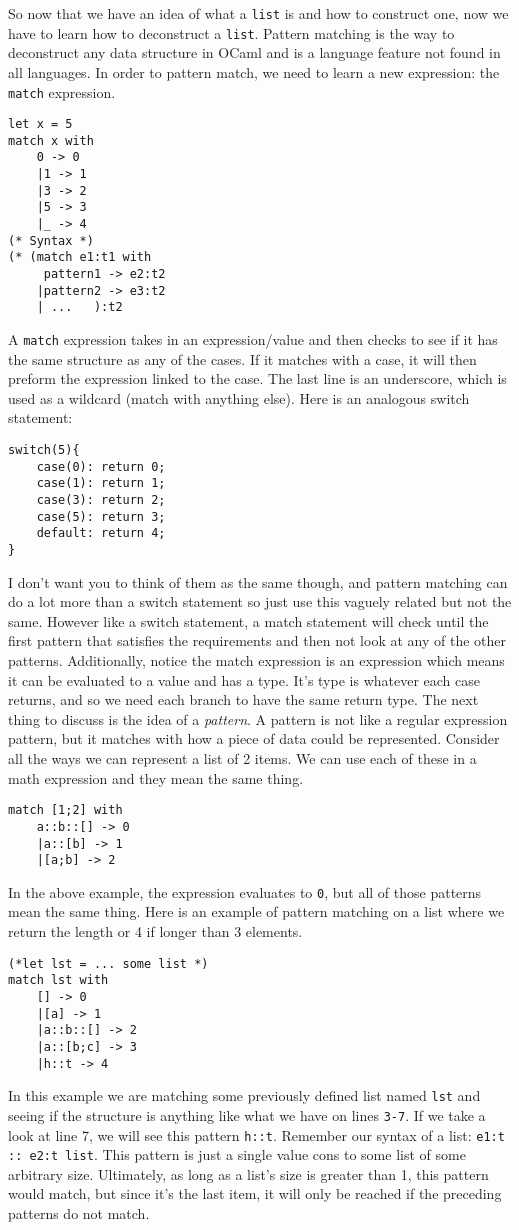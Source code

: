 \documentclass[main.tex]{subfiles}
\begin{document}
So now that we have an idea of what a \texttt{list} is and how to construct one, now we have to learn how to deconstruct a \texttt{list}. Pattern matching is the way to deconstruct any data structure in OCaml and is a language feature not found in all languages. In order to pattern match, we need to learn a new expression: the \texttt{match} expression. 
\begin{lstlisting}[style=Myocamlstyle]
let x = 5
match x with 
    0 -> 0
    |1 -> 1
    |3 -> 2
    |5 -> 3
    |_ -> 4
(* Syntax *)
(* (match e1:t1 with
     pattern1 -> e2:t2
    |pattern2 -> e3:t2
    | ...   ):t2
\end{lstlisting}
A \texttt{match} expression takes in an expression/value and then checks to see if it has the same structure as any of the cases. If it matches with a case, it will then preform the expression linked to the case. The last line is an underscore, which is used as a wildcard (match with anything else). Here is an analogous switch statement:
\begin{lstlisting}
switch(5){
    case(0): return 0;
    case(1): return 1;
    case(3): return 2;
    case(5): return 3;
    default: return 4;
}
\end{lstlisting}
I don't want you to think of them as the same though, and pattern matching can do a lot more than a switch statement so just use this vaguely related but not the same. However like a switch statement, a match statement will check until the first pattern that satisfies the requirements and then not look at any of the other patterns. Additionally, notice the match expression is an expression which means it can be evaluated to a value and has a type. It's type is whatever each case returns, and so we need each branch to have the same return type. 
The next thing to discuss is the idea of a \textit{pattern}. A pattern is not like a regular expression pattern, but it matches with how a piece of data could be represented. Consider all the ways we can represent a list of 2 items. We can use each of these in a math expression and they mean the same thing. 
\begin{lstlisting}[style=Myocamlstyle]
match [1;2] with
    a::b::[] -> 0
    |a::[b] -> 1
    |[a;b] -> 2
\end{lstlisting}
In the above example, the expression evaluates to \texttt{0}, but all of those patterns mean the same thing. Here is an example of pattern matching on a list where we return the length or 4 if longer than 3 elements.
\begin{lstlisting}[style=Myocamlstyle]
(*let lst = ... some list *)
match lst with
    [] -> 0
    |[a] -> 1
    |a::b::[] -> 2
    |a::[b;c] -> 3
    |h::t -> 4
\end{lstlisting}
In this example we are matching some previously defined list named \texttt{lst} and seeing if the structure is anything like what we have on lines \texttt{3-7}. If we take a look at line 7, we will see this pattern \texttt{h::t}. Remember our syntax of a list: \texttt{e1:t :: e2:t list}. This pattern is just a single value cons to some list of some arbitrary size. Ultimately, as long as a list's size is greater than 1, this pattern would match, but since it's the last item, it will only be reached if the preceding patterns do not match.
\end{document}
